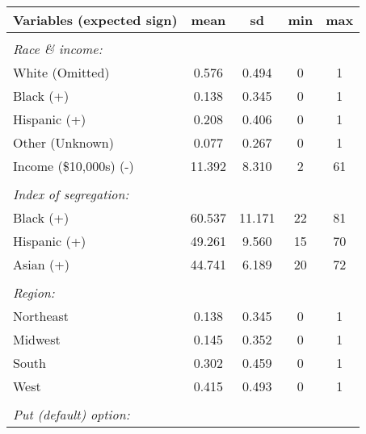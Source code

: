 \begin{tabular}{l*{1}{cccc}}
\hline\hline
Variables (expected sign)&        mean&          sd&         min&         max\\
\hline
& & & & \\ 
 \emph{Race \& income:} & & & \\ 
\hspace{5 mm}White (Omitted)&       0.576&       0.494&           0&           1\\
\hspace{5 mm}Black (+)&       0.138&       0.345&           0&           1\\
\hspace{5 mm}Hispanic (+)&       0.208&       0.406&           0&           1\\
\hspace{5 mm}Other (Unknown)&       0.077&       0.267&           0&           1\\
\hspace{5 mm}Income (\$10,000s) (-)&      11.392&       8.310&           2&          61\\
& & & & \\ 
 \emph{Index of segregation:} & & & \\ 
\hspace{5 mm}Black (+)&      60.537&      11.171&          22&          81\\
\hspace{5 mm}Hispanic (+)&      49.261&       9.560&          15&          70\\
\hspace{5 mm}Asian (+)&      44.741&       6.189&          20&          72\\
& & & & \\ 
 \emph{Region:} & & & \\ 
\hspace{5 mm}Northeast&       0.138&       0.345&           0&           1\\
\hspace{5 mm}Midwest&       0.145&       0.352&           0&           1\\
\hspace{5 mm}South  &       0.302&       0.459&           0&           1\\
\hspace{5 mm}West   &       0.415&       0.493&           0&           1\\
& & & & \\ 
 \emph{Put (default) option:} & & & \\ 

\end{tabular}
